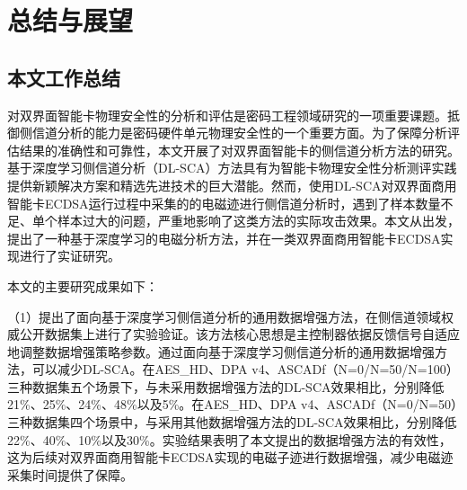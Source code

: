 \chapter{总结与展望}\label{chap:conclusion}{
	\section{本文工作总结}
	对双界面智能卡物理安全性的分析和评估是密码工程领域研究的一项重要课题。抵御侧信道分析的能力是密码硬件单元物理安全性的一个重要方面。为了保障分析评估结果的准确性和可靠性，本文开展了对双界面智能卡的侧信道分析方法的研究。基于深度学习侧信道分析（DL-SCA）方法具有为智能卡物理安全性分析测评实践提供新颖解决方案和精选先进技术的巨大潜能。然而，使用DL-SCA对双界面商用智能卡ECDSA运行过程中采集的的电磁迹进行侧信道分析时，遇到了样本数量不足、单个样本过大的问题，严重地影响了这类方法的实际攻击效果。本文从\jiaodu 出发，提出了一种基于深度学习的电磁分析方法，并在一类双界面商用智能卡ECDSA实现进行了实证研究。
	
	本文的主要研究成果如下：
	
	（1）提出了面向基于深度学习侧信道分析的通用数据增强方法，在侧信道领域权威公开数据集上进行了实验验证。该方法核心思想是主控制器依据反馈信号自适应地调整数据增强策略参数。通过面向基于深度学习侧信道分析的通用数据增强方法，可以减少DL-SCA\chenggongtiaoshu。在AES\_HD、DPA v4、ASCADf（N=0/N=50/N=100）三种数据集五个场景下，与未采用数据增强方法的DL-SCA效果相比，\chenggongtiaoshu 分别降低21\%、25\%、24\%、48\%以及5\%。在AES\_HD、DPA v4、ASCADf（N=0/N=50）三种数据集四个场景中，与采用其他数据增强方法的DL-SCA效果相比，\chenggongtiaoshu 分别降低22\%、40\%、10\%以及30\%。实验结果表明了本文提出的数据增强方法的有效性，这为后续对双界面商用智能卡ECDSA实现的电磁子迹进行数据增强，减少电磁迹采集时间提供了保障。
	
}
